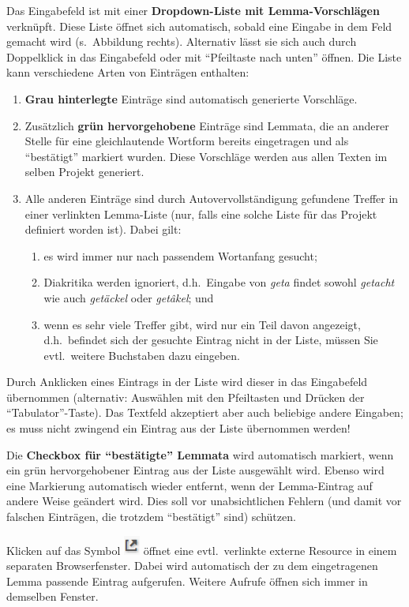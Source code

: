 \documentclass[11pt,a4paper,parskip=half]{scrartcl}
\begin{document}
Das Eingabefeld ist mit einer \textbf{Dropdown-Liste mit
  Lemma-Vorschlägen} verknüpft.  Diese Liste öffnet sich automatisch,
sobald eine Eingabe in dem Feld gemacht wird (s.~Abbildung rechts).
Alternativ lässt sie sich auch durch Doppelklick in das Eingabefeld
oder mit "`Pfeiltaste nach unten"' öffnen.  Die Liste kann
verschiedene Arten von Einträgen enthalten:
\begin{enumerate}
\item \textbf{Grau hinterlegte} Einträge sind automatisch generierte
  Vorschläge.
\item Zusätzlich \textbf{grün hervorgehobene} Einträge sind Lemmata,
  die an anderer Stelle für eine gleichlautende Wortform bereits
  eingetragen und als "`bestätigt"' markiert wurden.  Diese Vorschläge
  werden aus allen Texten im selben Projekt generiert.
\item Alle anderen Einträge sind durch Autovervollständigung gefundene Treffer in einer verlinkten Lemma-Liste (nur, falls eine solche Liste für das Projekt definiert worden ist). Dabei gilt:
  \begin{enumerate}
  \item es wird immer nur nach passendem Wortanfang gesucht;
  \item Diakritika werden ignoriert, d.h.\ Eingabe von
    \emph{geta} findet sowohl \emph{getacht} wie auch \emph{getäckel}
    oder \emph{getâkel}; und
  \item wenn es sehr viele Treffer gibt, wird nur ein Teil davon
    angezeigt, d.h.\ befindet sich der gesuchte Eintrag nicht in der
    Liste, müssen Sie evtl.\ weitere Buchstaben dazu eingeben.
  \end{enumerate}
\end{enumerate}

Durch Anklicken eines Eintrags in der Liste wird dieser in das
Eingabefeld übernommen (alternativ: Auswählen mit den Pfeiltasten und
Drücken der "`Tabulator"'-Taste).  Das Textfeld akzeptiert aber auch
beliebige andere Eingaben; es muss nicht zwingend ein Eintrag aus der
Liste übernommen werden!

Die \textbf{Checkbox für "`bestätigte"' Lemmata} wird automatisch markiert,
wenn ein grün hervorgehobener Eintrag aus der Liste ausgewählt wird.
Ebenso wird eine Markierung automatisch wieder entfernt, wenn der
Lemma-Eintrag auf andere Weise geändert wird.  Dies soll vor
unabsichtlichen Fehlern (und damit vor falschen Einträgen, die
trotzdem "`bestätigt"' sind) schützen.

Klicken auf das
Symbol \includegraphics[height=\baselineskip]{img/1.2/lemma-link.png} öffnet eine
evtl.\ verlinkte externe Resource in einem separaten Browserfenster.  Dabei wird
automatisch der zu dem eingetragenen Lemma passende Eintrag aufgerufen.  Weitere
Aufrufe öffnen sich immer in demselben Fenster.
\end{document}
